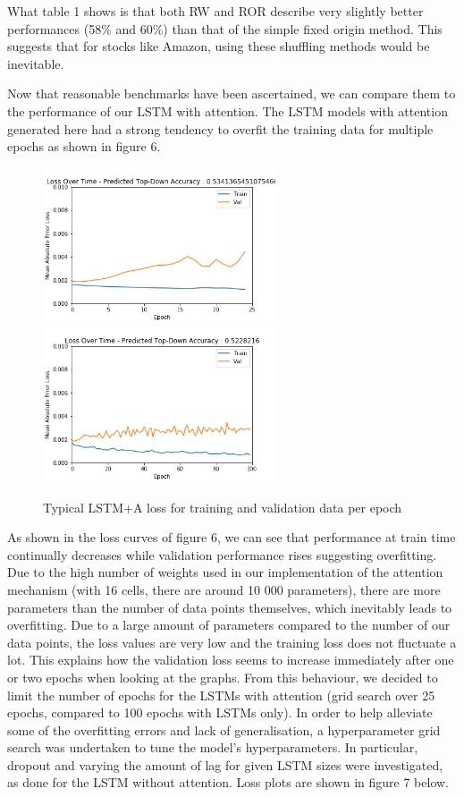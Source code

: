 \documentclass{article}
\begin{document}
What table 1 shows is that both RW and ROR describe very slightly better performances (58\% and 60\%) than that of the simple fixed origin method. This suggests that for stocks like Amazon, using these shuffling methods would be inevitable.

Now that reasonable benchmarks have been ascertained, we can compare them to the performance of our LSTM with attention. The LSTM models with attention generated here had a strong tendency to overfit the training data for multiple epochs as shown in figure 6. 

\begin{figure}[!h]
	\includegraphics[width=195pt]{lstm_att_v0_ts_1_drop_04_cells_64.png}
	\includegraphics[width=195pt]{lstm_att_v0_ts_5_drop_0_cells_64.png}
	\caption{Typical LSTM+A loss for training and validation data per epoch}
\end{figure}

As shown in the loss curves of figure 6, we can see that performance at train time continually decreases while validation performance rises suggesting overfitting. Due to the high number of weights used in our implementation of the attention mechanism (with 16 cells, there are around 10 000 parameters), there are more parameters than the number of data points themselves, which inevitably leads to overfitting. Due to a large amount of parameters compared to the number of our data points, the loss values are very low and the training loss does not fluctuate a lot. This explains how the validation loss seems to increase immediately after one or two epochs when looking at the graphs. From this behaviour, we decided to limit the number of epochs for the LSTMs with attention (grid search over 25 epochs, compared to 100 epochs with LSTMs only). In order to help alleviate some of the overfitting errors and lack of generalisation, a hyperparameter grid search was undertaken to tune the model’s hyperparameters. In particular, dropout and varying the amount of lag for given LSTM sizes were investigated, as done for the LSTM without attention. Loss plots are shown in figure 7 below. 
\end{document}
